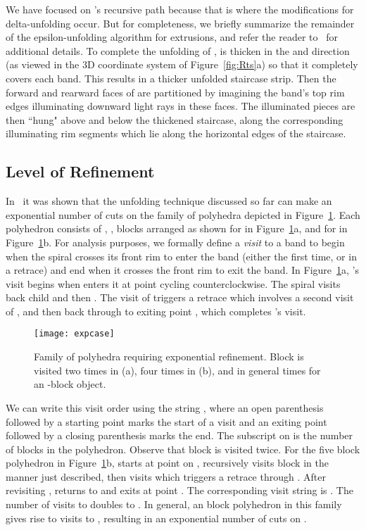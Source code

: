 \documentclass[11pt]{article}
\begin{document}
We have focused on 's recursive path because that is where the modifications
for delta-unfolding occur. But for completeness, we briefly summarize the
remainder of the epsilon-unfolding algorithm for extrusions, and
refer the reader to~\cite{Damian-Flatland-O'Rourke-2007-epsilon} for  additional details.
To complete the unfolding of ,  is thicken in the  and  direction (as viewed
in the 3D coordinate system of Figure~\ref{fig:Rts}a) so that it completely covers
each band. This results in a thicker unfolded staircase strip. Then the
forward and rearward faces of  are partitioned by imagining the band's top rim edges illuminating downward light rays in these
faces. The illuminated pieces are then ``hung" above and below the thickened staircase,
along the corresponding illuminating rim segments which lie along the horizontal edges of
the staircase.

\subsection{Level of Refinement}

In~\cite{Damian-Flatland-O'Rourke-2007-epsilon} it was shown that the unfolding technique discussed so far can make an exponential
number of cuts on the family of polyhedra
depicted in Figure~\ref{fig:expcase}. Each polyhedron consists of , , blocks
arranged as shown for  in Figure~\ref{fig:expcase}a, and for  in Figure~\ref{fig:expcase}b. For analysis purposes, we formally define a \emph{visit} to a band to begin
when the spiral crosses its front rim to enter the band (either the first time, or in a retrace) and
end when it crosses the front rim to exit the band.
In Figure~\ref{fig:expcase}a, 's visit begins when  enters it at
point  cycling counterclockwise. The spiral visits back child
 and then . The visit of  triggers a retrace which involves a second visit of , and then
back through  to exiting point , which completes 's visit.
\begin{figure}[htbp]
\centering
\texttt{[image: expcase]}
\caption{Family of polyhedra requiring exponential refinement. Block  is visited two times in (a), four times in (b), and in general  times for an -block object.}
\label{fig:expcase}
\end{figure}
We can write this visit order using the string
, where an open parenthesis followed by a starting point
marks the start of a visit and  an exiting point followed by
a closing parenthesis marks the end.
The subscript on  is the number of blocks in the polyhedron. Observe that block 
is visited twice.
For the five block polyhedron in
Figure~\ref{fig:expcase}b,  starts at point  on ,
recursively visits block  in the
manner just described, then visits  which triggers a retrace through .
After revisiting ,  returns to  and exits at point . The corresponding visit string is
.
The number of visits to  doubles to . In general,
an  block polyhedron in this family gives rise to
 visits to , resulting in an exponential
number of cuts on .
\end{document}
